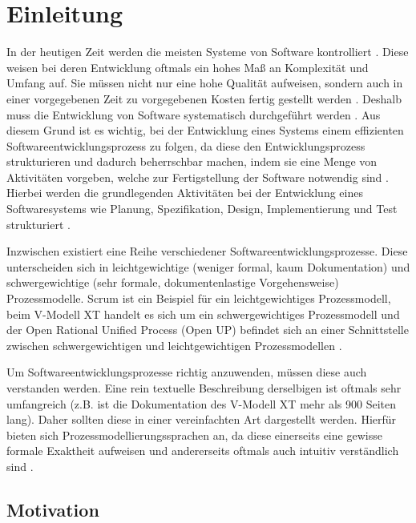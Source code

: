 \chapter{Einleitung}\label{sec:chapter1}

In der heutigen Zeit werden die meisten Systeme von Software kontrolliert \cite{Puntambekar2007}. Diese weisen bei deren Entwicklung oftmals ein hohes Maß an Komplexität und Umfang auf. Sie müssen nicht nur eine hohe Qualität aufweisen, sondern auch in einer vorgegebenen Zeit zu vorgegebenen Kosten fertig gestellt werden \cite{Grechenig2010}. Deshalb muss die Entwicklung von Software systematisch durchgeführt werden \cite{gumm2012einfuhrung}. Aus diesem Grund ist es wichtig, bei der Entwicklung eines Systems einem effizienten Softwareentwicklungsprozess zu folgen, da diese den Entwicklungsprozess strukturieren und dadurch beherrschbar machen, indem sie eine Menge von Aktivitäten vorgeben, welche zur Fertigstellung der Software notwendig sind \cite{richling2011autonomie}. Hierbei werden die grundlegenden Aktivitäten bei der Entwicklung eines Softwaresystems wie Planung, Spezifikation, Design, Implementierung und Test strukturiert \cite{gumm2012einfuhrung, Hanser2010}. \newline

Inzwischen existiert eine Reihe verschiedener Softwareentwicklungsprozesse. Diese unterscheiden sich in leichtgewichtige (weniger formal, kaum Dokumentation) und schwergewichtige (sehr formale, dokumentenlastige Vorgehensweise) Prozessmodelle. Scrum ist ein Beispiel für ein leichtgewichtiges Prozessmodell, beim V-Modell XT handelt es sich um ein schwergewichtiges Prozessmodell und der Open Rational Unified Process (Open UP) befindet sich an einer Schnittstelle zwischen schwergewichtigen und leichtgewichtigen Prozessmodellen \cite{Hanser2010}.\newline

Um Softwareentwicklungsprozesse richtig anzuwenden, müssen diese auch verstanden werden. Eine rein textuelle Beschreibung derselbigen ist oftmals sehr umfangreich (z.B. ist die Dokumentation des V-Modell XT mehr als 900 Seiten lang). Daher sollten diese in einer vereinfachten Art dargestellt werden. Hierfür bieten sich Prozessmodellierungssprachen an, da diese einerseits eine gewisse formale Exaktheit aufweisen und andererseits oftmals auch intuitiv verständlich sind \cite{thomas2009,kircher2006}. \newline

\section{Motivation}



